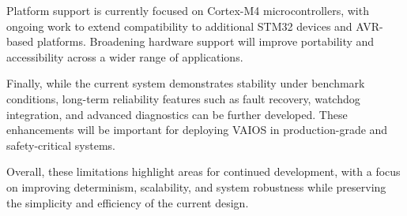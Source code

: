 Platform support is currently focused on Cortex-M4 microcontrollers, with ongoing work to extend compatibility to additional STM32 devices and AVR-based platforms. Broadening hardware support will improve portability and accessibility across a wider range of applications.

Finally, while the current system demonstrates stability under benchmark conditions, long-term reliability features such as fault recovery, watchdog integration, and advanced diagnostics can be further developed. These enhancements will be important for deploying VAIOS in production-grade and safety-critical systems.

Overall, these limitations highlight areas for continued development, with a focus on improving determinism, scalability, and system robustness while preserving the simplicity and efficiency of the current design.